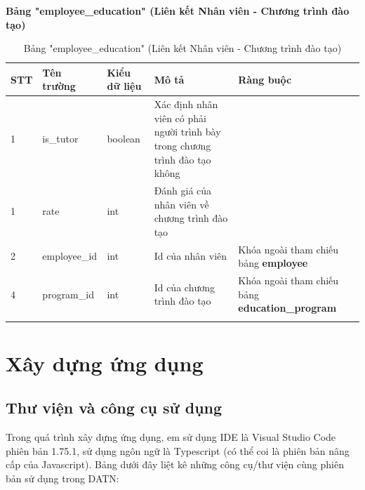\documentclass[../DoAn.tex]{subfiles}
\begin{document}
\textbf{Bảng "employee\_education" (Liên kết Nhân viên - Chương trình đào tạo)}
\begin{longtable}{|p{}|p{}|p{}|p{}|p{}|}
\hline
\textbf{STT} & \textbf{Tên trường} & \textbf{Kiểu dữ liệu} & \textbf{Mô tả } & \textbf{Ràng buộc} \\ \hline
1   & is\_tutor & boolean & Xác định nhân viên có phải người trình bày trong chương trình đào tạo không & \\ \hline
1   & rate & int & Đánh giá của nhân viên về chương trình đào tạo & \\ \hline
2   & employee\_id & int & Id của nhân viên & Khóa ngoài tham chiếu bảng \textbf{employee} \\ \hline
4   & program\_id & int & Id của chương trình đào tạo & Khóa ngoài tham chiếu bảng \textbf{education\_program} \\ \hline
\caption{Bảng "employee\_education" (Liên kết Nhân viên - Chương trình đào tạo)}
\end{longtable}

\section{Xây dựng ứng dụng}
\subsection{Thư viện và công cụ sử dụng}
Trong quá trình xây dựng ứng dụng, em sử dụng IDE là Visual Studio Code phiên bản 1.75.1, sử dụng ngôn ngữ là Typescript (có thể coi là phiên bản nâng cấp của Javascript). Bảng dưới đây liệt kê những công cụ/thư viện cùng phiên bản sử dụng trong DATN:
\end{document}
